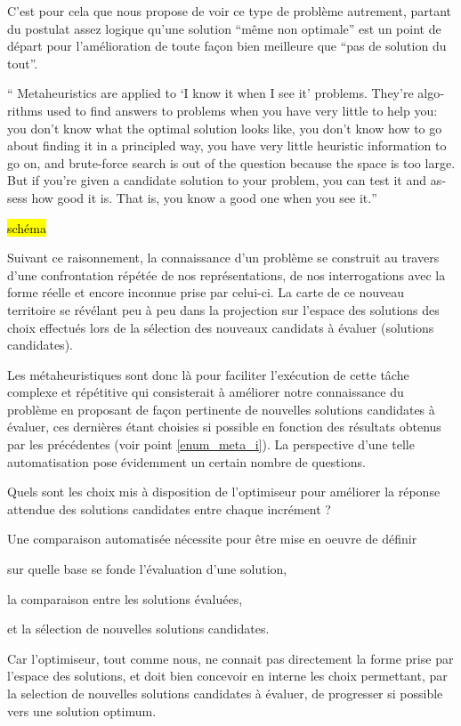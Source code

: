 C'est pour cela que \textcite[7]{Luke2013} nous propose de voir ce type de problème autrement, partant du postulat assez logique qu'une solution \enquote{même non optimale} est un point de départ pour l'amélioration de toute façon bien meilleure que \enquote{pas de solution du tout}.

\foreignquote{english}{ Metaheuristics are applied to \enquote{I know it when I see it} problems. They're algorithms used to find answers to problems when you have very little to help you: you don't know what the optimal solution looks like, you don't know how to go about finding it in a principled way, you have very little heuristic information to go on, and brute-force search is out of the question because the space is too large. But if you're given a candidate solution to your problem, you can test it and assess how good it is. That is, you know a good one when you see it.}

\hl{schéma}

Suivant ce raisonnement, la connaissance d'un problème se construit au travers d'une confrontation répétée de nos représentations, de nos interrogations avec la forme réelle et encore inconnue prise par celui-ci. La carte de ce nouveau territoire se révélant peu à peu dans la projection sur l'espace des solutions des choix effectués lors de la sélection des nouveaux candidats à évaluer (solutions candidates).

Les métaheuristiques sont donc là pour faciliter l'exécution de cette tâche complexe et répétitive qui consisterait à améliorer notre connaissance du problème en proposant de façon pertinente de nouvelles solutions candidates à évaluer, ces dernières étant choisies si possible en fonction des résultats obtenus par les précédentes (voir point \ref{enum_meta_i}). La perspective d'une telle automatisation pose évidemment un certain nombre de questions.

Quels sont les choix mis à disposition de l'optimiseur pour améliorer la réponse attendue des solutions candidates entre chaque incrément ? \autocite[19]{Weise2011}

Une comparaison automatisée nécessite pour être mise en oeuvre de définir \begin{enumerate*}[label=(\alph*)]
\item sur quelle base se fonde l'évaluation d'une solution,
\item la comparaison entre les solutions évaluées,
\item et la sélection de nouvelles solutions candidates.\end{enumerate*} Car l'optimiseur, tout comme nous, ne connait pas directement la forme prise par l'espace des solutions, et doit bien concevoir en interne les choix permettant, par la selection de nouvelles solutions candidates à évaluer, de progresser si possible vers une solution optimum.

